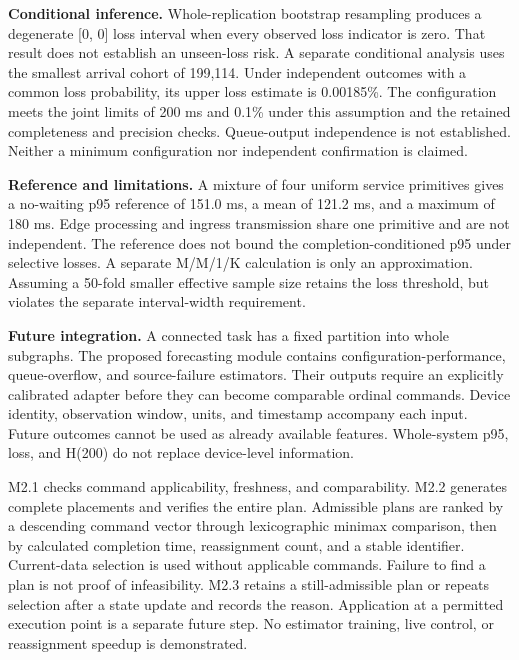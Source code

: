 \documentclass{psta}
\begin{document}
\textbf{Conditional inference.} Whole-replication bootstrap resampling produces a degenerate {[}0, 0{]} loss interval when every observed loss indicator is zero. That result does not establish an unseen-loss risk. A separate conditional analysis uses the smallest arrival cohort of 199,114. Under independent outcomes with a common loss probability, its upper loss estimate is 0.00185\%. The configuration meets the joint limits of 200 ms and 0.1\% under this assumption and the retained completeness and precision checks. Queue-output independence is not established. Neither a minimum configuration nor independent confirmation is claimed.

\textbf{Reference and limitations.} A mixture of four uniform service primitives gives a no-waiting p95 reference of 151.0 ms, a mean of 121.2 ms, and a maximum of 180 ms. Edge processing and ingress transmission share one primitive and are not independent. The reference does not bound the completion-conditioned p95 under selective losses. A separate M/M/1/K calculation is only an approximation. Assuming a 50-fold smaller effective sample size retains the loss threshold, but violates the separate interval-width requirement.

\textbf{Future integration.} A connected task has a fixed partition into whole subgraphs. The proposed forecasting module contains configuration-performance, queue-overflow, and source-failure estimators. Their outputs require an explicitly calibrated adapter before they can become comparable ordinal commands. Device identity, observation window, units, and timestamp accompany each input. Future outcomes cannot be used as already available features. Whole-system p95, loss, and H(200) do not replace device-level information.

M2.1 checks command applicability, freshness, and comparability. M2.2 generates complete placements and verifies the entire plan. Admissible plans are ranked by a descending command vector through lexicographic minimax comparison, then by calculated completion time, reassignment count, and a stable identifier. Current-data selection is used without applicable commands. Failure to find a plan is not proof of infeasibility. M2.3 retains a still-admissible plan or repeats selection after a state update and records the reason. Application at a permitted execution point is a separate future step. No estimator training, live control, or reassignment speedup is demonstrated.
\end{document}

